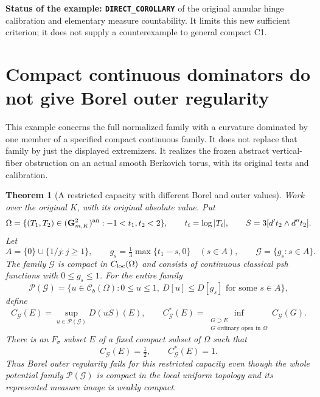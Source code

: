 \documentclass[11pt,a4paper]{article}
\numberwithin{equation}{section}
\newtheorem{theorem}{Theorem}[section]
\theoremstyle{definition}
\theoremstyle{remark}
\begin{document}
\noindent\textbf{Status of the example: \texttt{DIRECT\_COROLLARY}}
of the original annular hinge calibration and elementary measure
countability. It limits this new sufficient criterion; it does not
supply a counterexample to general compact C1.



\section{Compact continuous dominators do not give Borel outer regularity}
\label{sec:r6-compact-dominator-outer-failure}

This example concerns the full normalized family with a curvature
dominated by one member of a specified compact continuous family.
It does not replace that family by just the displayed extremizers.
It realizes the frozen abstract vertical-fiber obstruction on an
actual smooth Berkovich torus, with its original tests and calibration.

\begin{theorem}[A restricted capacity with different Borel and outer values]
\label{thm:r6-compact-dominator-outer-failure}
Work over the original $K$, with its original absolute value. Put
\[
 \Omega=\{(T_1,T_2)\in(\mathbf G_{m,K}^{2})^{\rm an}:
                         -1<t_1,t_2<2\},
 \qquad t_i=\log|T_i|,
 \qquad S=3[d't_2\wedge d''t_2].
\]
Let
\[
 A=\{0\}\cup\{1/j:j\ge1\},\qquad
 g_s=\tfrac13\max\{t_1-s,0\}\quad(s\in A),
 \qquad \mathscr G=\{g_s:s\in A\}.
\]
The family $\mathscr G$ is compact in $C_{\rm loc}(\Omega)$ and
consists of continuous classical psh functions with $0\le g_s\le1$.
For the entire family
\[
 \mathscr P(\mathscr G)=
 \{u\in\mathcal C_b(\Omega):0\le u\le1,
                \ D[u]\le D[g_s]\text{ for some }s\in A\},
\]
define
\[
 C_{\mathscr G}(E)=\sup_{u\in\mathscr P(\mathscr G)}
                              D(uS)(E),\qquad
 C_{\mathscr G}^{*}(E)=
       \inf_{\substack{G\supset E\\G\text{ ordinary open in }\Omega}}
                              C_{\mathscr G}(G).
\]
There is an $F_\sigma$ subset $E$ of a fixed compact subset of
$\Omega$ such that
\[
                       C_{\mathscr G}(E)=\tfrac12,
                  \qquad C_{\mathscr G}^{*}(E)=1.
\]
Thus Borel outer regularity fails for this restricted capacity even
though the whole potential family $\mathscr P(\mathscr G)$ is
compact in the local uniform topology and its represented measure
image is weakly compact.
\end{theorem}
\end{document}
